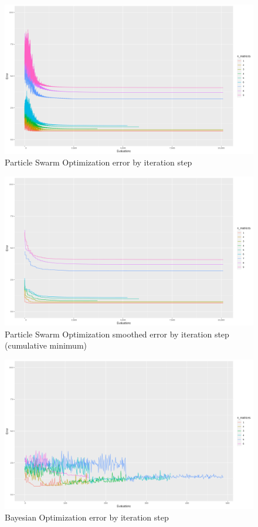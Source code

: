 \begin{figure}[!htb]
\centering
\includegraphics[width=\textwidth]{figures/alg_pso}
\decoRule
\caption[Particle Swarm Optimization]{Particle Swarm Optimization error by iteration step}
\label{fig:alg_pso}
\end{figure}

\begin{figure}[!htb]
\centering
\includegraphics[width=\textwidth]{figures/alg_pso_smoothed}
\decoRule
\caption[Particle Swarm Optimization (smoothed)]{Particle Swarm Optimization smoothed error by iteration step (cumulative minimum)}
\label{fig:alg_pso_smoothed}
\end{figure}

\begin{figure}[!htb]
\centering
\includegraphics[width=\textwidth]{figures/alg_bayesian}
\decoRule
\caption[Bayesian Optimization]{Bayesian Optimization error by iteration step}
\label{fig:alg_bayesian}
\end{figure}

